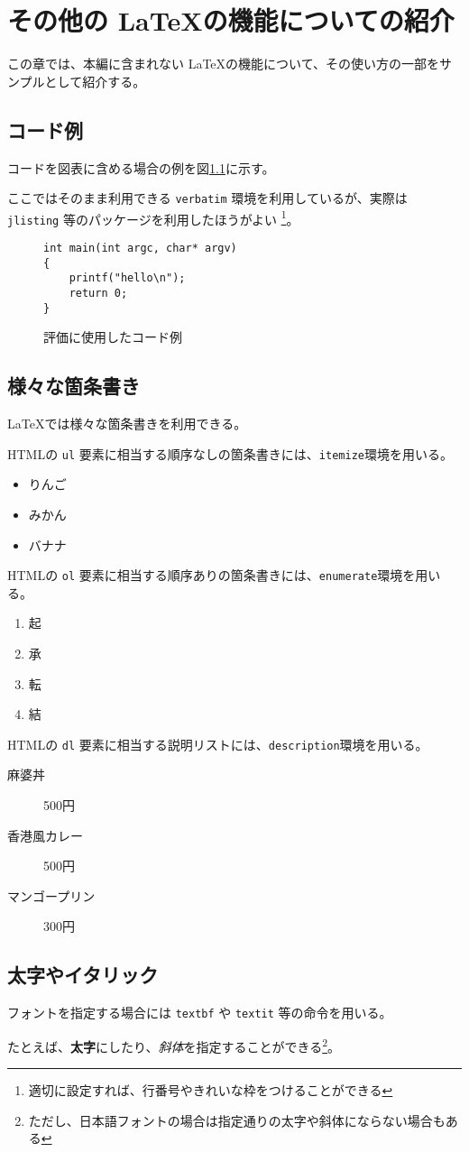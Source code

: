 \chapter{その他の \LaTeX の機能についての紹介}
この章では、本編に含まれない \LaTeX の機能について、その使い方の一部をサンプルとして紹介する。

\section{コード例}
コードを図表に含める場合の例を図\ref{eval_code}に示す。

ここではそのまま利用できる \verb|verbatim| 環境を利用しているが、実際は \verb|jlisting| 等のパッケージを利用したほうがよい
\footnote{適切に設定すれば、行番号やきれいな枠をつけることができる}。

\begin{figure}[tb]
  \begin{screen}
    \begin{verbatim}int main(int argc, char* argv)
{
    printf("hello\n");
    return 0;
}\end{verbatim}
  \end{screen}
  \caption{評価に使用したコード例}
  \label{eval_code}
\end{figure}

\section{様々な箇条書き}
\LaTeX では様々な箇条書きを利用できる。

HTMLの \verb|ul| 要素に相当する順序なしの箇条書きには、\verb|itemize|環境を用いる。

\begin{itemize}
  \item りんご
  \item みかん
  \item バナナ
\end{itemize}

HTMLの \verb|ol| 要素に相当する順序ありの箇条書きには、\verb|enumerate|環境を用いる。

\begin{enumerate}
  \item 起
  \item 承
  \item 転
  \item 結
\end{enumerate}

HTMLの \verb|dl| 要素に相当する説明リストには、\verb|description|環境を用いる。

\begin{description}
  \item[麻婆丼] 500円
  \item[香港風カレー] 500円
  \item[マンゴープリン] 300円
\end{description}

\section{太字やイタリック}
フォントを指定する場合には \verb|textbf| や \verb|textit| 等の命令を用いる。

たとえば、\textbf{太字}にしたり、\textit{斜体}を指定することができる\footnote{ただし、日本語フォントの場合は指定通りの太字や斜体にならない場合もある}。
